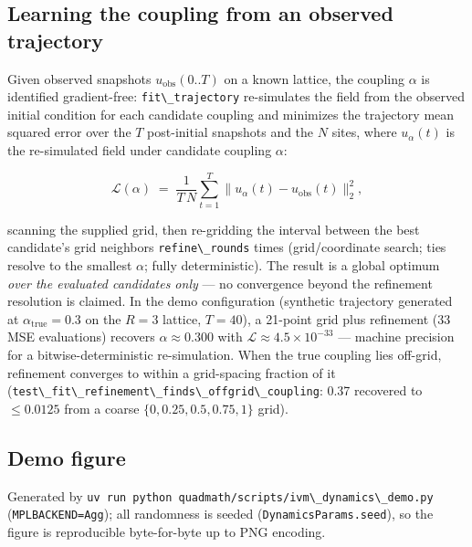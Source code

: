\documentclass[
  10pt,
]{article}
\newcommand{\passthrough}[1]{#1}
\begin{document}
\subsection{Learning the coupling from an observed
trajectory}\label{learning-the-coupling-from-an-observed-trajectory}

Given observed snapshots \(u_{\mathrm{obs}}(0..T)\) on a known lattice,
the coupling \(\alpha\) is identified gradient-free:
\passthrough{\lstinline!fit\_trajectory!} re-simulates the field from
the observed initial condition for each candidate coupling and minimizes
the trajectory mean squared error over the \(T\) post-initial snapshots
and the \(N\) sites, where \(u_{\alpha}(t)\) is the re-simulated field
under candidate coupling \(\alpha\):

\begin{equation}
\label{eq:ivmdyn-mse}
\mathcal{L}(\alpha) \;=\; \frac{1}{T\,N} \sum_{t=1}^{T}
\big\lVert u_{\alpha}(t) - u_{\mathrm{obs}}(t) \big\rVert_2^2 ,
\end{equation}

scanning the supplied grid, then re-gridding the interval between the
best candidate's grid neighbors \passthrough{\lstinline!refine\_rounds!}
times (grid/coordinate search; ties resolve to the smallest \(\alpha\);
fully deterministic). The result is a global optimum \emph{over the
evaluated candidates only} --- no convergence beyond the refinement
resolution is claimed. In the demo configuration (synthetic trajectory
generated at \(\alpha_{\text{true}} = 0.3\) on the \(R=3\) lattice,
\(T = 40\)), a 21-point grid plus refinement (33 MSE evaluations)
recovers \(\alpha \approx 0.300\) with
\(\mathcal{L} \approx 4.5 \times 10^{-33}\) --- machine precision for a
bitwise-deterministic re-simulation. When the true coupling lies
off-grid, refinement converges to within a grid-spacing fraction of it
(\passthrough{\lstinline!test\_fit\_refinement\_finds\_offgrid\_coupling!}:
0.37 recovered to \(\le 0.0125\) from a coarse
\(\{0, 0.25, 0.5, 0.75, 1\}\) grid).

\subsection{Demo figure}\label{demo-figure}

Generated by
\passthrough{\lstinline!uv run python quadmath/scripts/ivm\_dynamics\_demo.py!}
(\passthrough{\lstinline!MPLBACKEND=Agg!}); all randomness is seeded
(\passthrough{\lstinline!DynamicsParams.seed!}), so the figure is
reproducible byte-for-byte up to PNG encoding.
\end{document}
